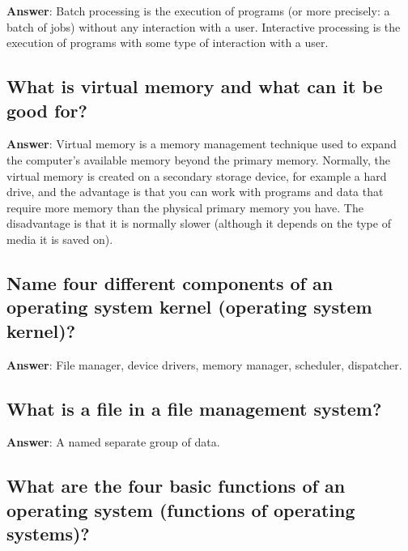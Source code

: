 \documentclass[a4paper,11pt,oneside]{article}
\begin{document}
\begin{sloppypar}
\label{q:112:sa:en:True}

\textbf{Answer}: Batch processing is the execution of programs (or more precisely: a batch of jobs) without any interaction with a user. Interactive processing is the execution of programs with some type of interaction with a user.



\subsection{What is virtual memory and what can it be good for?}

\label{q:113:sa:en:True}

\textbf{Answer}: Virtual memory is a memory management technique used to expand the computer's available memory beyond the primary memory. Normally, the virtual memory is created on a secondary storage device, for example a hard drive, and the advantage is that you can work with programs and data that require more memory than the physical primary memory you have. The disadvantage is that it is normally slower (although it depends on the type of media it is saved on).



\subsection{Name four different components of an operating system kernel (operating system kernel)?}

\label{q:114:sa:en:True}

\textbf{Answer}: File manager, device drivers, memory manager, scheduler, dispatcher.



\subsection{What is a file in a file management system?}

\label{q:115:sa:en:True}

\textbf{Answer}: A named separate group of data.



\subsection{What are the four basic functions of an operating system (functions of operating systems)?}

\label{q:116:sa:en:True}


\end{sloppypar}
\end{document}
